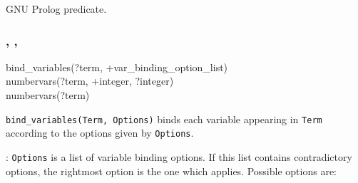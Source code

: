 \Portability

GNU Prolog predicate.

\subsubsection{,\label{bind-variables/2}
               ,
               }


\begin{TemplatesOneCol}
bind\_variables(?term, +var\_binding\_option\_list)\\
numbervars(?term, +integer, ?integer)\\
numbervars(?term)

\end{TemplatesOneCol}

\Description

\texttt{bind\_variables(Term, Options)} binds each variable appearing in
\texttt{Term} according to the options given by \texttt{Options}.

: \texttt{Options} is a list of variable
binding options. If this list contains contradictory options, the rightmost
option is the one which applies. Possible options are:

